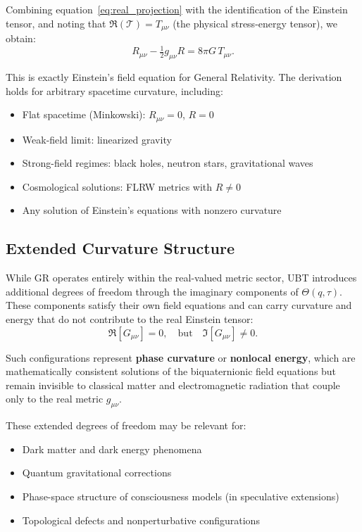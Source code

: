 Combining equation~\eqref{eq:real_projection} with the identification of the Einstein tensor, and noting that $\Re(\mathcal{T}) = T_{\mu\nu}$ (the physical stress-energy tensor), we obtain:
\begin{equation}
R_{\mu\nu} - \tfrac{1}{2} g_{\mu\nu} R = 8 \pi G \, T_{\mu\nu}.
\label{eq:einstein_equations}
\end{equation}

This is exactly Einstein's field equation for General Relativity. The derivation holds for arbitrary spacetime curvature, including:
\begin{itemize}
  \item Flat spacetime (Minkowski): $R_{\mu\nu} = 0$, $R = 0$
  \item Weak-field limit: linearized gravity
  \item Strong-field regimes: black holes, neutron stars, gravitational waves
  \item Cosmological solutions: FLRW metrics with $R \neq 0$
  \item Any solution of Einstein's equations with nonzero curvature
\end{itemize}

\subsection{Extended Curvature Structure}

While GR operates entirely within the real-valued metric sector, UBT introduces additional degrees of freedom through the imaginary components of $\Theta(q,\tau)$. These components satisfy their own field equations and can carry curvature and energy that do not contribute to the real Einstein tensor:
\begin{equation}
\Re[G_{\mu\nu}] = 0, \quad \text{but} \quad \Im[G_{\mu\nu}] \neq 0.
\end{equation}

Such configurations represent \textbf{phase curvature} or \textbf{nonlocal energy}, which are mathematically consistent solutions of the biquaternionic field equations but remain invisible to classical matter and electromagnetic radiation that couple only to the real metric $g_{\mu\nu}$.

These extended degrees of freedom may be relevant for:
\begin{itemize}
  \item Dark matter and dark energy phenomena
  \item Quantum gravitational corrections
  \item Phase-space structure of consciousness models (in speculative extensions)
  \item Topological defects and nonperturbative configurations
\end{itemize}

